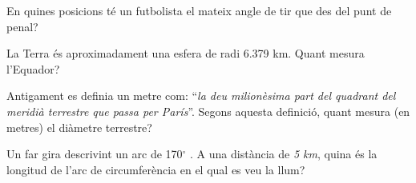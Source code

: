 \begin{mylist}

\exer  En quines posicions té un futbolista el mateix angle de tir que des del punt de penal?

 


\exer  La Terra és aproximadament una esfera de radi 6.379 km. Quant mesura l'Equador?

\exer  Antigament es definia un metre com: ``\textit{la deu milionèsima part del quadrant del meridià terrestre que passa per París}''. Segons aquesta definició, quant mesura (en metres) el diàmetre terrestre? 

\exer   Un far gira descrivint un arc de 170${}^\circ$ . A una distància de \textit{5 km}, quina és la longitud de l'arc de circumferència en el qual es veu la llum?


\end{mylist}
